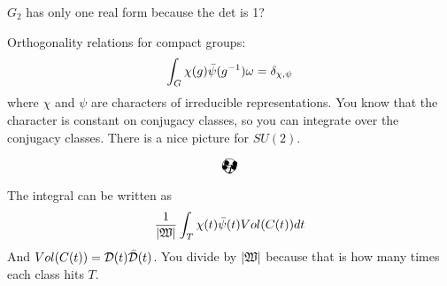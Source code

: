    $G_2$ has only one real form because the det is 1?

  Orthogonality relations for compact groups:
  \[
    \int_G \chi(g)\bar\psi(g^{-1}) \omega = \delta_{\chi,\psi}
  \]
  where $\chi$ and $\psi$ are characters of irreducible representations. You know that
  the character is constant on conjugacy classes, so you can integrate over the
  conjugacy classes. There is a nice picture for $SU(2)$.

  \[\begin{xy}
    (0,0) *\xycircle(2,2){},
    (-2,0);(2,0) **\crv{(-2,-1)&(2,-1)}
        **\crv{~*=<2pt>@{.} (-2,1)&(2,1)},(.5,-1) *{T},
    (-1,1.732);(-1,-1.732) **\crv{(-1.5,1.6)&(-1.5,-1.6)}
        **\crv{~*=<2pt>@{.} (-.7,1.6)&(-.7,-1.6)},
    (1.4142136,1.4142136);(1.4142136,-1.4142136) **\crv{(1.2,1.4142136)&(1.2,-1.4142136)}
        **\crv{~*=<2pt>@{.} (1.6,1.4142136)&(1.6,-1.4142136)},
    (1.55,.49) *{\bullet}, (1.28,-.61) *{\bullet},
    (-1.35,-.57) *{\bullet}, (-.79,.68) *{\bullet},
  \end{xy}\]

  The integral can be written as
  \[
    \frac{1}{|\mathfrak{W}|}\int_T \chi(t)\bar\psi(t)Vol(C(t))dt
  \]
  And $Vol(C(t)) = \mathcal{D}(t)\bar {\mathcal{D}}(t)$. You divide by $|\mathfrak{W}|$ because that is how many
  times each class hits $T$.

